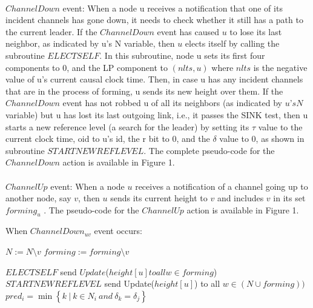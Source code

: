 \paragraph{}$ChannelDown$ event: When a node u receives a notification that one of its incident channels has gone down, it needs to check whether it still has a path to the current leader. If the $ChannelDown$ event has caused $u$ to lose its last neighbor, as indicated by u’s N variable, then $u$ elects itself by calling the subroutine $ELECTSELF$. In this subroutine, node u sets its first four components to 0, and the LP component to $(nlts,u)$ where $nlts$ is the negative value of u’s current causal clock time. Then, in case u has any incident channels that are in the process of forming, u sends its new height over them. If the $ChannelDown$ event has not robbed u of all its neighbors (as indicated by $u’s N$ variable) but u has lost its last outgoing link, i.e., it passes the SINK test, then u starts a new reference level (a search for the leader) by setting its $\tau$ value to the current clock time, oid to u’s id, the r bit to 0, and the $\delta$ value to $0$, as shown in subroutine $STARTNEWREFLEVEL$. The complete pseudo-code for the $ChannelDown$ action is available in Figure 1.

\paragraph{}$ChannelUp$ event: When a node $u$ receives a notification of a channel going up to another node, say $v$, then $u$ sends its current height to $v$ and includes $v$ in its set $forming_u$ . The pseudo-code for the $ChannelUp$ action is available in Figure 1.

\begin{algorithm}
	\caption{When $ChannelDown_{uv}$ event occurs:}
	\begin{algorithmic}[1]
		
		\State $N := N \setminus {v}$
		\State $forming := forming \setminus {v}$
		
		\State $ELECTSELF$
		\State send $Update$($height[u] to all w\in forming$)
		\State $STARTNEWREFLEVEL$
		\State send Update($height[u]$) to all $w \in (N \cup forming))$
		\State $pred_i = \min \left\lbrace  k~|~k \in N_i~and~\delta _k = \delta _j \right\rbrace  $
		\EndIf
		
		
	\end{algorithmic}

\end{algorithm}

